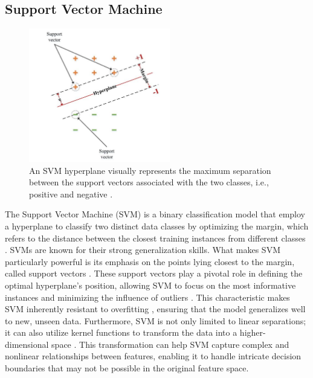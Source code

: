 {\subsection{Support Vector Machine}
\begin{figure}
    \centering
    \includegraphics[width=0.55\textwidth]{figures/Classifiers/SVM.png}  
    \caption{An SVM hyperplane visually represents the maximum separation between the support vectors associated with the two classes, i.e., positive and negative \cite{jahed2020examining}. }
    \label{fig: SVM}
\end{figure}
The Support Vector Machine (SVM) is a binary classification model that employ a hyperplane to classify two distinct data classes by optimizing the margin, which refers to the distance between the closest training instances from different classes \cite{survey_brain_biometrics}. SVMs are known for their strong generalization skills. What makes SVM particularly powerful is its emphasis on the points lying closest to the margin, called support vectors \cite{sahbi2019totally}. These support vectors play a pivotal role in defining the optimal hyperplane's position, allowing SVM to focus on the most informative instances and minimizing the influence of outliers \cite{pisner2020support}. This characteristic makes SVM inherently resistant to overfitting \cite{xia2015method}, ensuring that the model generalizes well to new, unseen data. Furthermore, SVM is not only limited to linear separations; it can also utilize kernel functions to transform the data into a higher-dimensional space \cite{pisner2020support}. This transformation can help SVM capture complex and nonlinear relationships between features, enabling it to handle intricate decision boundaries that may not be possible in the original feature space.
\smallskip

}
